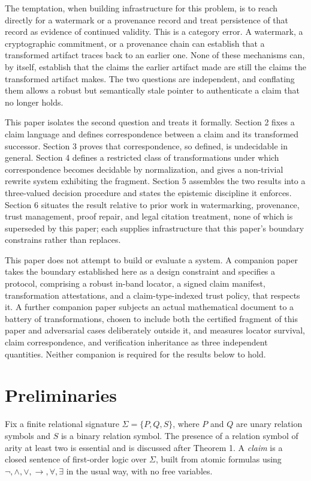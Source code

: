 \documentclass[11pt]{article}
\begin{document}
The temptation, when building infrastructure for this problem, is to reach directly for a watermark or a provenance record and treat persistence of that record as evidence of continued validity. This is a category error. A watermark, a cryptographic commitment, or a provenance chain can establish that a transformed artifact traces back to an earlier one. None of these mechanisms can, by itself, establish that the claims the earlier artifact made are still the claims the transformed artifact makes. The two questions are independent, and conflating them allows a robust but semantically stale pointer to authenticate a claim that no longer holds.

This paper isolates the second question and treats it formally. Section 2 fixes a claim language and defines correspondence between a claim and its transformed successor. Section 3 proves that correspondence, so defined, is undecidable in general. Section 4 defines a restricted class of transformations under which correspondence becomes decidable by normalization, and gives a non-trivial rewrite system exhibiting the fragment. Section 5 assembles the two results into a three-valued decision procedure and states the epistemic discipline it enforces. Section 6 situates the result relative to prior work in watermarking, provenance, trust management, proof repair, and legal citation treatment, none of which is superseded by this paper; each supplies infrastructure that this paper's boundary constrains rather than replaces.

This paper does not attempt to build or evaluate a system. A companion paper takes the boundary established here as a design constraint and specifies a protocol, comprising a robust in-band locator, a signed claim manifest, transformation attestations, and a claim-type-indexed trust policy, that respects it. A further companion paper subjects an actual mathematical document to a battery of transformations, chosen to include both the certified fragment of this paper and adversarial cases deliberately outside it, and measures locator survival, claim correspondence, and verification inheritance as three independent quantities. Neither companion is required for the results below to hold.

\section{Preliminaries}

Fix a finite relational signature $\Sigma = \{P, Q, S\}$, where $P$ and $Q$ are unary relation symbols and $S$ is a binary relation symbol. The presence of a relation symbol of arity at least two is essential and is discussed after Theorem 1. A \emph{claim} is a closed sentence of first-order logic over $\Sigma$, built from atomic formulas using $\neg, \wedge, \vee, \rightarrow, \forall, \exists$ in the usual way, with no free variables.
\end{document}
